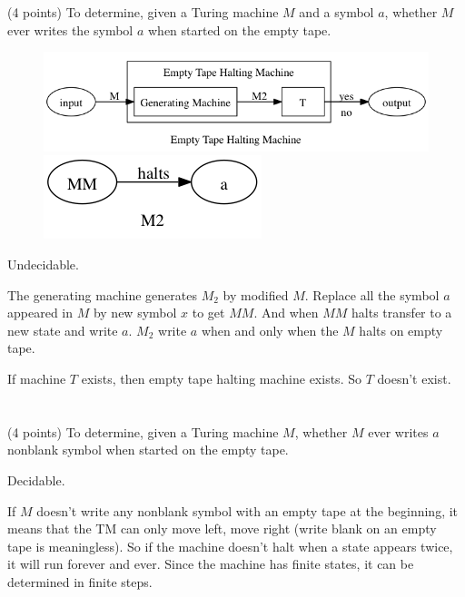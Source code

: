 \documentclass[paper=a4, fontsize=11pt]{scrartcl} %
\begin{document}
\section{}
\begin{fancyquotes}
  (4 points) To determine, given a Turing machine $M$ and a symbol
  $a$, whether $M$ ever writes the symbol $a$ when started on the
  empty tape.
\end{fancyquotes}

\begin{figure}[H]
  \centering
  \includegraphics[width=\textwidth]{9-4.gv.png}
  \includegraphics[width=.5\textwidth]{9-4.gv.2.png}
\end{figure}

Undecidable.

The generating machine generates $M_2$ by modified $M$. Replace all
the symbol $a$ appeared in $M$ by new symbol $x$ to get $MM$. And when
$MM$ halts transfer to a new state and write $a$. $M_2$ write $a$ when
and only when the $M$ halts on empty tape.

If machine $T$ exists, then empty tape halting machine exists. So $T$
doesn't exist.


\section{}
\begin{fancyquotes}
  (4 points) To determine, given a Turing machine $M$, whether $M$
  ever writes $a$ nonblank symbol when started on the empty tape.
\end{fancyquotes}

Decidable.

If $M$ doesn't write any nonblank symbol with an empty tape
at the beginning, it means that the TM can only move left, move right
(write blank on an empty tape is meaningless). So if the machine
doesn't halt when a state appears twice, it will run forever and
ever. Since the machine has finite states, it can be determined in
finite steps.
\end{document}
